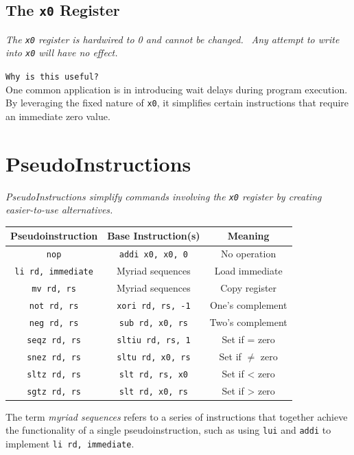 \subsection{The \texttt{x0} Register} 
\textit{The \texttt{x0} register is hardwired to 0 and cannot be changed.} \ \textit{Any attempt to write into \texttt{x0} will have no effect.}

\texttt{Why is this useful?} \\
One common application is in introducing wait delays during program execution. By leveraging the fixed nature of \texttt{x0}, it simplifies certain instructions that require an immediate zero value.

\section{PseudoInstructions}
\textit{PseudoInstructions simplify commands involving the \texttt{x0} register by creating easier-to-use alternatives.} \newline
\begin{center}
        \begin{tabular}{|c|c|c|}
        \hline
        \textbf{Pseudoinstruction} & \textbf{Base Instruction(s)} & \textbf{Meaning} \\ \hline
        \texttt{nop}               & \texttt{addi x0, x0, 0}      & No operation     \\ \hline
        \texttt{li rd, immediate}  & Myriad sequences             & Load immediate   \\ \hline
        \texttt{mv rd, rs}         & Myriad sequences             & Copy register    \\ \hline
        \texttt{not rd, rs}        & \texttt{xori rd, rs, -1}     & One's complement \\ \hline
        \texttt{neg rd, rs}        & \texttt{sub rd, x0, rs}      & Two's complement \\ \hline
        \texttt{seqz rd, rs}       & \texttt{sltiu rd, rs, 1}     & Set if = zero    \\ \hline
        \texttt{snez rd, rs}       & \texttt{sltu rd, x0, rs}     & Set if $\neq$ zero    \\ \hline
        \texttt{sltz rd, rs}       & \texttt{slt rd, rs, x0}      & Set if < zero    \\ \hline
        \texttt{sgtz rd, rs}       & \texttt{slt rd, x0, rs}      & Set if > zero    \\ \hline
        \end{tabular}
\end{center} 
The term \textit{myriad sequences} refers to a series of instructions that together achieve the functionality of a single pseudoinstruction, such as using \texttt{lui} and \texttt{addi} to implement \texttt{li rd, immediate}.

